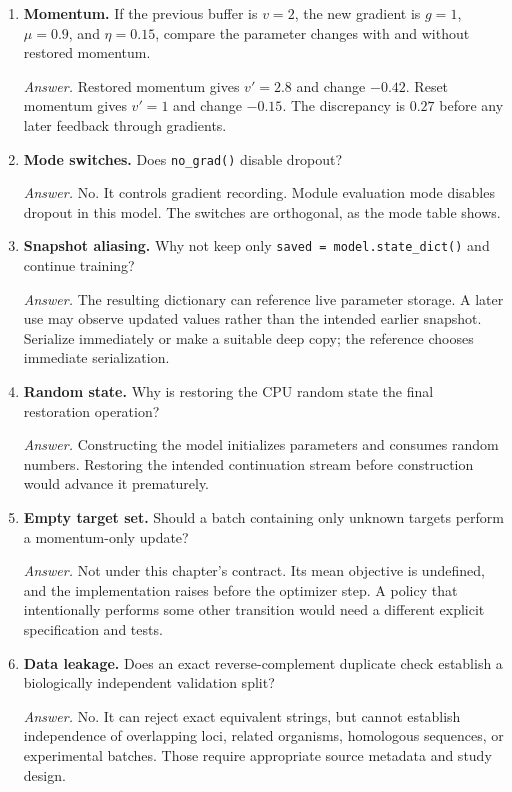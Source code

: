 \begin{enumerate}
\item \textbf{Momentum.} If the previous buffer is $v=2$, the new gradient is $g=1$, $\mu=0.9$, and $\eta=0.15$, compare the parameter changes with and without restored momentum.\par
\textit{Answer.} Restored momentum gives $v'=2.8$ and change $-0.42$. Reset momentum gives $v'=1$ and change $-0.15$. The discrepancy is $0.27$ before any later feedback through gradients.

\item \textbf{Mode switches.} Does \texttt{no\_grad()} disable dropout?\par
\textit{Answer.} No. It controls gradient recording. Module evaluation mode disables dropout in this model. The switches are orthogonal, as the mode table shows.

\item \textbf{Snapshot aliasing.} Why not keep only \texttt{saved = model.state\_dict()} and continue training?\par
\textit{Answer.} The resulting dictionary can reference live parameter storage. A later use may observe updated values rather than the intended earlier snapshot. Serialize immediately or make a suitable deep copy; the reference chooses immediate serialization.

\item \textbf{Random state.} Why is restoring the CPU random state the final restoration operation?\par
\textit{Answer.} Constructing the model initializes parameters and consumes random numbers. Restoring the intended continuation stream before construction would advance it prematurely.

\item \textbf{Empty target set.} Should a batch containing only unknown targets perform a momentum-only update?\par
\textit{Answer.} Not under this chapter's contract. Its mean objective is undefined, and the implementation raises before the optimizer step. A policy that intentionally performs some other transition would need a different explicit specification and tests.

\item \textbf{Data leakage.} Does an exact reverse-complement duplicate check establish a biologically independent validation split?\par
\textit{Answer.} No. It can reject exact equivalent strings, but cannot establish independence of overlapping loci, related organisms, homologous sequences, or experimental batches. Those require appropriate source metadata and study design.


\end{enumerate}

